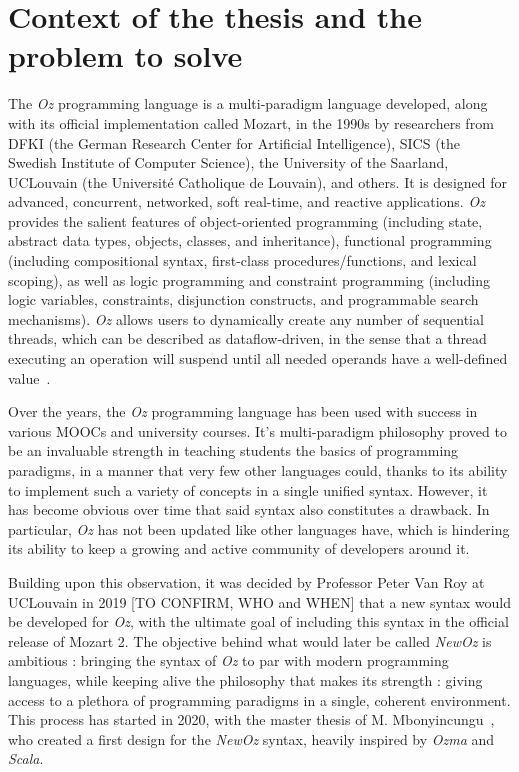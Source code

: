 
\section{Context of the thesis and the problem to solve}\label{sec:ch1-context}
The \textit{Oz} programming language is a multi-paradigm language developed, along with its official implementation called Mozart, in the 1990s by researchers from DFKI (the German Research Center for Artificial Intelligence), SICS (the Swedish Institute of Computer Science), the University of the Saarland, UCLouvain (the Université Catholique de Louvain), and others.
It is designed for advanced, concurrent, networked, soft real-time, and reactive applications.
\textit{Oz} provides the salient features of object-oriented programming (including state, abstract data types, objects, classes, and inheritance),
functional programming (including compositional syntax, first-class procedures/functions, and lexical scoping), as well as
logic programming and constraint programming (including logic variables, constraints, disjunction constructs, and programmable search mechanisms).
\textit{Oz} allows users to dynamically create any number of sequential threads, which can be described as dataflow-driven, in the sense that a thread executing an operation will suspend until all needed operands have a well-defined value~\cite{mozart2tutorial}.\newline

Over the years, the \textit{Oz} programming language has been used with success in various MOOCs and university courses.
It's multi-paradigm philosophy proved to be an invaluable strength in teaching students the basics of programming paradigms, in a manner that very few other languages could, thanks to its ability to implement such a variety of concepts in a single unified syntax.
However, it has become obvious over time that said syntax also constitutes a drawback.
In particular, \textit{Oz} has not been updated like other languages have, which is hindering its ability to keep a growing and active community of developers around it.\newline

Building upon this observation, it was decided by Professor Peter Van Roy at UCLouvain in 2019 [TO CONFIRM, WHO and WHEN] that a new syntax would be developed for \textit{Oz}, with the ultimate goal of including this syntax in the official release of Mozart 2.
The objective behind what would later be called \textit{NewOz} is ambitious : bringing the syntax of \textit{Oz} to par with modern programming languages, while keeping alive the philosophy that makes its strength : giving access to a plethora of programming paradigms in a single, coherent environment.
This process has started in 2020, with the master thesis of M. Mbonyincungu~\cite{jpthesis}, who created a first design for the \textit{NewOz} syntax, heavily inspired by \textit{Ozma} and \textit{Scala}.\newline

